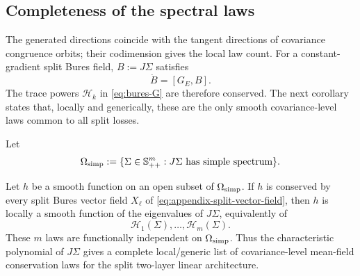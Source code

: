 \subsection{Completeness of the spectral laws}

The generated directions coincide with the tangent directions of
covariance congruence orbits; their codimension gives the local law count.
For a constant-gradient split Bures field, \(B:=J\Sigma\) satisfies
\[
\dot B=[G_E,B].
\]
The trace powers $\mathcal H_k$ in \eqref{eq:bures-G} are
therefore conserved. The next corollary states that, locally and generically, these
are the only smooth covariance-level laws common to all split losses.

Let
\[
\Omega_{\rm simp}
:=
\{\Sigma\in\mathbb{S}_{++}^m:J\Sigma\text{ has simple spectrum}\}.
\]

\begin{corollary}
\label{cor:appendix-covariance-completeness}
Let \(h\) be a smooth function on an open subset of \(\Omega_{\rm simp}\).
If \(h\) is conserved by every split Bures vector field \(X_\ell\) of
\eqref{eq:appendix-split-vector-field}, then \(h\) is locally a smooth
function of the eigenvalues of \(J\Sigma\), equivalently of
\[
\mathcal H_1(\Sigma),\ldots,\mathcal H_m(\Sigma).
\]
These \(m\) laws are functionally independent on \(\Omega_{\rm simp}\).
Thus the characteristic polynomial of \(J\Sigma\) gives a complete
local/generic list of covariance-level mean-field conservation laws for the
split two-layer linear architecture.
\end{corollary}

